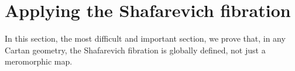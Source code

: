 \section{Applying the Shafarevich fibration}
In this section, the most difficult and important section, we prove that, in any Cartan geometry, the Shafarevich fibration is globally defined, not just a meromorphic map.
